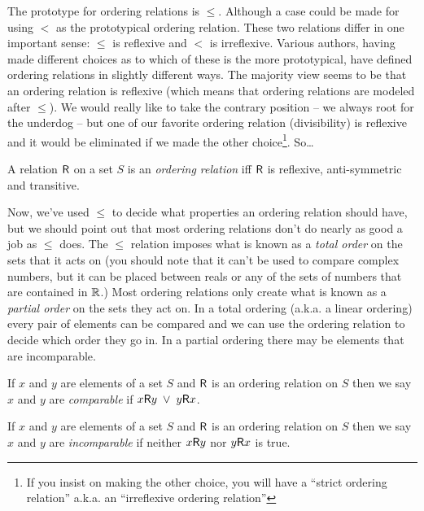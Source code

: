 The prototype for ordering relations is $\leq$.  Although a case
could be made for using $<$ as the prototypical ordering relation.  
These two relations differ in one important sense: $\leq$ is reflexive
and $<$ is irreflexive.  Various authors, having made different 
choices as to which of these is the more prototypical, have
defined ordering relations in slightly different ways.  The 
majority view seems to be that an ordering relation is
reflexive (which means that 
ordering relations are modeled after $\leq$).  
We would really like to take the contrary position -- we always
root for the underdog -- but one of our favorite ordering
relation (divisibility) is reflexive and it would be eliminated
if we made the other choice\footnote{If you insist on making the other %
choice, you will have a ``strict ordering relation'' a.k.a. an ``irreflexive %
ordering relation''}.  So\ldots

\begin{defi}
A relation $\mbox{\textsf R}$ on a set $S$ is an 
\emph{ordering relation}
iff $\mbox{\textsf R}$ is reflexive, anti-symmetric and transitive.
\end{defi}

Now, we've used $\leq$ to decide what properties an ordering relation
should have, but we should point out that most ordering relations
don't do nearly as good a job as $\leq$ does.  The $\leq$ relation
imposes what is known as a \emph{total order}
on the sets that it acts on (you should note that it can't be used
to compare complex numbers, but it can be placed between reals or
any of the sets of numbers that are contained in ${\mathbb R}$.)  Most
ordering relations only create what is known as a 
\emph{partial order} on the sets they act on.  In a total ordering
(a.k.a. a linear ordering) every pair of elements can be compared
and we can use the ordering relation to decide which order they go
in.  In a partial ordering there may be elements that are incomparable.

\begin{defi}
If $x$ and $y$ are elements of a set $S$ and $\mbox{\textsf R}$ is an ordering
relation on $S$ then we say $x$ and $y$ are \emph{comparable} if
$x\mbox{\textsf R} y \; \lor \; y\mbox{\textsf R} x$.
\end{defi}

\begin{defi}
If $x$ and $y$ are elements of a set $S$ and $\mbox{\textsf R}$ is an ordering
relation on $S$ then we say $x$ and $y$ are \emph{incomparable} if
neither $x\mbox{\textsf R} y$ nor $y\mbox{\textsf R} x$ is true.
\end{defi}

